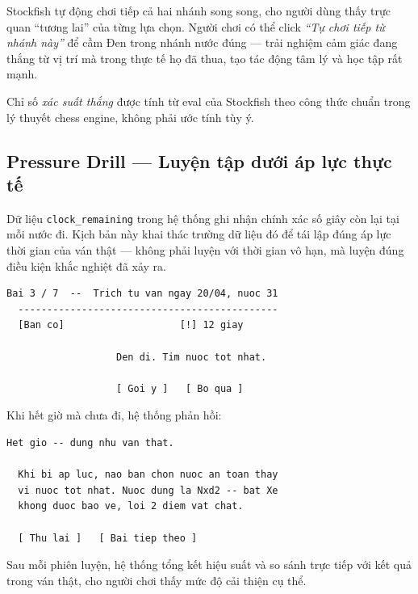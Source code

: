 \documentclass[14pt,a4paper]{extarticle}
\begin{document}
Stockfish tự động chơi tiếp cả hai nhánh song song, cho người dùng thấy trực
quan ``tương lai'' của từng lựa chọn. Người chơi có thể click \textit{``Tự chơi
tiếp từ nhánh này''} để cầm Đen trong nhánh nước đúng --- trải nghiệm cảm giác
đang thắng từ vị trí mà trong thực tế họ đã thua, tạo tác động tâm lý và học
tập rất mạnh.

Chỉ số \textit{xác suất thắng} được tính từ eval của Stockfish theo công thức
chuẩn trong lý thuyết chess engine, không phải ước tính tùy ý.

\subsection{Pressure Drill --- Luyện tập dưới áp lực thực tế}

Dữ liệu \texttt{clock\_remaining} trong hệ thống ghi nhận chính xác số giây
còn lại tại mỗi nước đi. Kịch bản này khai thác trường dữ liệu đó để tái lập
đúng áp lực thời gian của ván thật --- không phải luyện với thời gian vô hạn,
mà luyện đúng điều kiện khắc nghiệt đã xảy ra.

\newpage
\begin{uibox}
\begin{Verbatim}[fontsize=\small]
  Bai 3 / 7  --  Trich tu van ngay 20/04, nuoc 31
  ---------------------------------------------
  [Ban co]                    [!] 12 giay

                   Den di. Tim nuoc tot nhat.

                   [ Goi y ]   [ Bo qua ]
\end{Verbatim}
\end{uibox}

Khi hết giờ mà chưa đi, hệ thống phản hồi:

\begin{uibox}
\begin{Verbatim}[fontsize=\small]
  Het gio -- dung nhu van that.

  Khi bi ap luc, nao ban chon nuoc an toan thay
  vi nuoc tot nhat. Nuoc dung la Nxd2 -- bat Xe
  khong duoc bao ve, loi 2 diem vat chat.

  [ Thu lai ]   [ Bai tiep theo ]
\end{Verbatim}
\end{uibox}

Sau mỗi phiên luyện, hệ thống tổng kết hiệu suất và so sánh trực tiếp với kết
quả trong ván thật, cho người chơi thấy mức độ cải thiện cụ thể.
\end{document}
